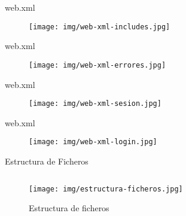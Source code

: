 \documentclass[spanish,xcolor=table,svgnames]{beamer}
\begin{document}
\begin{frame}{web.xml}
  \begin{figure}[H]
    \begin{center}
        \texttt{[image: img/web-xml-includes.jpg]}
    \end{center}
    \label{fig:web-xml-includes}
  \end{figure}
\end{frame}

\begin{frame}{web.xml}
  \begin{figure}[H]
    \begin{center}
        \texttt{[image: img/web-xml-errores.jpg]}
    \end{center}
    \label{fig:web-xml-errores}
  \end{figure}
\end{frame}

\begin{frame}{web.xml}
  \begin{figure}[H]
    \begin{center}
        \texttt{[image: img/web-xml-sesion.jpg]}
    \end{center}
    \label{fig:web-xml-sesion}
  \end{figure}
\end{frame}

\begin{frame}{web.xml}
  \begin{figure}[H]
    \begin{center}
        \texttt{[image: img/web-xml-login.jpg]}
    \end{center}
    \label{fig:web-xml-login}
  \end{figure}
\end{frame}


\begin{frame}{Estructura de Ficheros}
  \begin{columns}[onlytextwidth]
    \begin{column}{0.5\textwidth}
      \centering
      \begin{figure}[H]
        \begin{center}
        \texttt{[image: img/estructura-ficheros.jpg]}
        \end{center}
        \caption{Estructura de ficheros}
        \label{fig:estructura-proyecto-3}
      \end{figure}
    \end{column}
    \begin{column}{0.5\textwidth}
    \end{column}
  \end{columns}
\end{frame}
\end{document}
